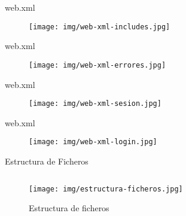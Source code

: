 \documentclass[spanish,xcolor=table,svgnames]{beamer}
\begin{document}
\begin{frame}{web.xml}
  \begin{figure}[H]
    \begin{center}
        \texttt{[image: img/web-xml-includes.jpg]}
    \end{center}
    \label{fig:web-xml-includes}
  \end{figure}
\end{frame}

\begin{frame}{web.xml}
  \begin{figure}[H]
    \begin{center}
        \texttt{[image: img/web-xml-errores.jpg]}
    \end{center}
    \label{fig:web-xml-errores}
  \end{figure}
\end{frame}

\begin{frame}{web.xml}
  \begin{figure}[H]
    \begin{center}
        \texttt{[image: img/web-xml-sesion.jpg]}
    \end{center}
    \label{fig:web-xml-sesion}
  \end{figure}
\end{frame}

\begin{frame}{web.xml}
  \begin{figure}[H]
    \begin{center}
        \texttt{[image: img/web-xml-login.jpg]}
    \end{center}
    \label{fig:web-xml-login}
  \end{figure}
\end{frame}


\begin{frame}{Estructura de Ficheros}
  \begin{columns}[onlytextwidth]
    \begin{column}{0.5\textwidth}
      \centering
      \begin{figure}[H]
        \begin{center}
        \texttt{[image: img/estructura-ficheros.jpg]}
        \end{center}
        \caption{Estructura de ficheros}
        \label{fig:estructura-proyecto-3}
      \end{figure}
    \end{column}
    \begin{column}{0.5\textwidth}
    \end{column}
  \end{columns}
\end{frame}
\end{document}
